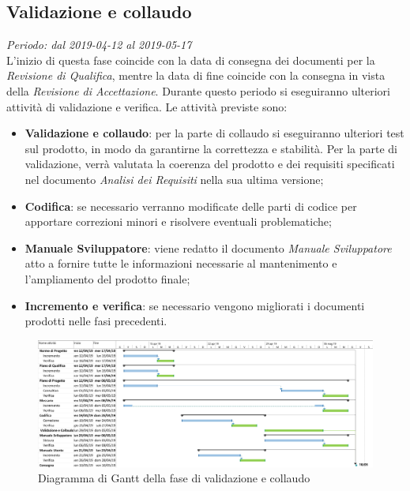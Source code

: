 \subsection{Validazione e collaudo}
\textit{Periodo: dal 2019-04-12 al 2019-05-17 } \\
L'inizio di questa fase coincide con la data di consegna dei documenti per la 
\textit{Revisione di Qualifica}, mentre la data di fine coincide con la 
consegna in vista della \textit{Revisione di Accettazione}. Durante questo periodo 
si eseguiranno ulteriori attività di validazione e verifica. Le attività 
previste sono: 
\begin{itemize}	
	\item \textbf{Validazione e collaudo}: per la parte di collaudo si 
	eseguiranno ulteriori test sul prodotto, in modo da garantirne la 
	correttezza e stabilità. Per la parte di validazione, verrà 
	valutata la coerenza del prodotto e dei requisiti specificati nel documento 
	\textit{Analisi dei Requisiti} nella sua ultima versione;
	\item \textbf{Codifica}: se necessario verranno modificate delle parti di codice per apportare correzioni minori e risolvere eventuali problematiche;
	\item \textbf{Manuale Sviluppatore}: viene redatto il documento \textit{Manuale Sviluppatore} atto a fornire tutte le informazioni necessarie al mantenimento e l'ampliamento del prodotto finale;
	\item \textbf{Incremento e verifica}: se necessario vengono migliorati i 
	documenti prodotti nelle fasi precedenti.
\end{itemize}
\begin{figure}[H]
	\includegraphics[width=0.99\linewidth]{res/images/gantt_val.jpg}
	\caption{Diagramma di Gantt della fase di validazione e collaudo}
\end{figure}